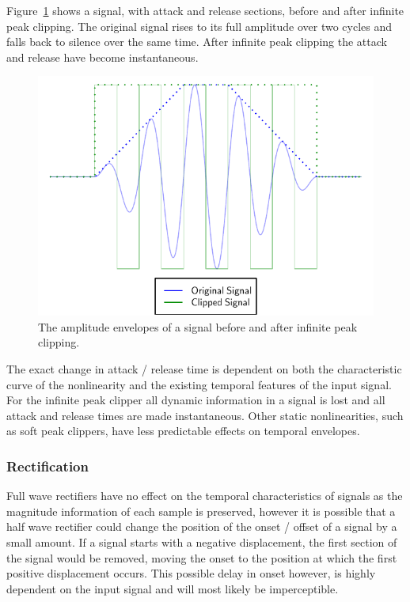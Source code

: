 			Figure~\ref{fig:InfinitePeakClipping} shows a signal, with attack and release sections, before and
			after infinite peak clipping. The original signal rises to its full amplitude over two cycles and
			falls back to silence over the same time. After infinite peak clipping the attack and release have
			become instantaneous.

			\begin{figure}[h!]
				\centering
				\includegraphics{chapter5/Images/InfinitePeakClipping.pdf}
				\caption{The amplitude envelopes of a signal before and after infinite peak clipping.}
				\label{fig:InfinitePeakClipping}
			\end{figure}

			The exact change in attack / release time is dependent on both the characteristic curve of the
			nonlinearity and the existing temporal features of the input signal. For the infinite peak clipper
			all dynamic information in a signal is lost and all attack and release times are made
			instantaneous. Other static nonlinearities, such as soft peak clippers, have less predictable
			effects on temporal envelopes. 

		\subsubsection*{Rectification}
			Full wave rectifiers have no effect on the temporal characteristics of signals as the magnitude
			information of each sample is preserved, however it is possible that a half wave rectifier could
			change the position of the onset / offset of a signal by a small amount. If a signal starts with a
			negative displacement, the first section of the signal would be removed, moving the onset to the
			position at which the first positive displacement occurs. This possible delay in onset however, is
			highly dependent on the input signal and will most likely be imperceptible.
			
